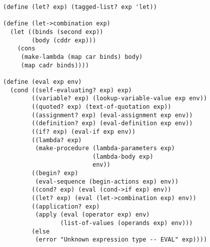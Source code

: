\documentclass[a4paper,12pt]{article}
\begin{document}
\begin{lstlisting}
(define (let? exp) (tagged-list? exp 'let))

(define (let->combination exp)
  (let ((binds (second exp))
        (body (cddr exp)))
    (cons
     (make-lambda (map car binds) body)
     (map cadr binds))))

(define (eval exp env)
  (cond ((self-evaluating? exp) exp)
        ((variable? exp) (lookup-variable-value exp env))
        ((quoted? exp) (text-of-quotation exp))
        ((assignment? exp) (eval-assignment exp env))
        ((definition? exp) (eval-definition exp env))
        ((if? exp) (eval-if exp env))
        ((lambda? exp)
         (make-procedure (lambda-parameters exp)
                         (lambda-body exp)
                         env))
        ((begin? exp)
         (eval-sequence (begin-actions exp) env))
        ((cond? exp) (eval (cond->if exp) env))
        ((let? exp) (eval (let->combination exp) env))
        ((application? exp)
         (apply (eval (operator exp) env)
                (list-of-values (operands exp) env)))
        (else
         (error "Unknown expression type -- EVAL" exp))))
\end{lstlisting}
\end{document}
